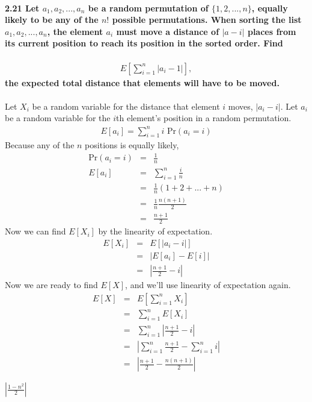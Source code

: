 \documentclass{article}
\begin{document}
\paragraph{2.21 Let $a_1, a_2, ..., a_n$ be a random permutation of 
$\{1, 2, ..., n\}$, equally likely to be any of the $n!$ possible permutations. 
When sorting the list $a_1, a_2, ..., a_n$, the element $a_i$ must move a 
distance of $|a-i|$ places from its current position to reach its 
position in the sorted order. Find}
\begin{eqnarray*}
E\left[\sum_{i=1}^n |a_i-1|\right],
\end{eqnarray*}
\textbf{the expected total distance that elements will have to be moved.\\\\}
Let $X_i$ be a random variable for the distance that element $i$ moves, 
$|a_i-i|$. Let $a_i$ be a random variable for the $i$th element's 
position in a random permutation.
\begin{eqnarray*}
E[a_i] = \sum_{i=1}^n i\mbox{ Pr}(a_i=i)
\end{eqnarray*}
Because any of the $n$ positions is equally likely,
\begin{eqnarray*}
\mbox{Pr}(a_i=i) & = & \frac{1}{n}\\
E[a_i] & = & \sum_{i=1}^n \frac{i}{n}\\
	& = & \frac{1}{n}(1+2+...+n)\\
	& = & \frac{1}{n}\frac{n(n+1)}{2}\\
	& = & \frac{n+1}{2}
\end{eqnarray*}
Now we can find $E[X_i]$ by the linearity of expectation.
\begin{eqnarray*}
E[X_i] & = & E[|a_i-i|]\\
	& = & |E[a_i]-E[i]|\\
	& = & \left|\frac{n+1}{2}-i\right|
\end{eqnarray*}
Now we are ready to find $E[X]$, and we'll use linearity of expectation again.
\begin{eqnarray*}
E[X] & = & E\left[\sum_{i=1}^n X_i\right]\\
	& = & \sum_{i=1}^n E[X_i]\\
	& = & \sum_{i=1}^n \left|\frac{n+1}{2}-i\right|\\
	& = & \left|\sum_{i=1}^n \frac{n+1}{2}-\sum_{i=1}^n i\right|\\
	& = & \left|\frac{n+1}{2}-\frac{n(n+1)}{2}\right|
\end{eqnarray*}
\begin{center}
$\boxed{\left|\frac{1-n^2}{2}\right|}$
\end{center}
\end{document}
